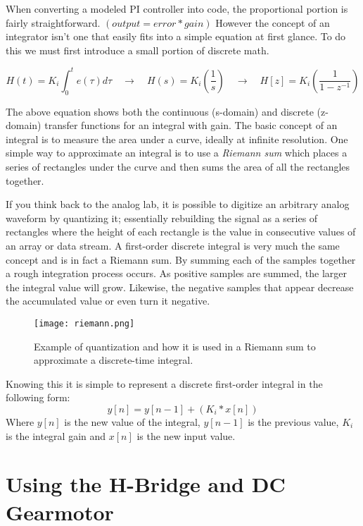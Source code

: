 \documentclass[openany,11pt,fleqn]{book} %
\begin{document}
When converting a modeled PI controller into code, the proportional portion is fairly straightforward. $(output = error * gain)$ However the concept of an integrator isn't one that easily fits into a simple equation at first glance. To do this we must first introduce a small portion of discrete math.

\begin{equation*}
H(t) = K_{i}\int_{0}^{t}e(\tau)d\tau \quad \rightarrow \quad H(s) = K_{i}\left(\frac{1}{s}\right) \quad \rightarrow \quad H[z] = K_{i}\left(\frac{1}{1-z^{-1}}\right)
\end{equation*} 


\noindent The above equation shows both the continuous (s-domain) and discrete (z-domain) transfer functions for an integral with gain. The basic concept of an integral is to measure the area under a curve, ideally at infinite resolution. One simple way to approximate an integral is to use a \textit{Riemann sum} which places a series of rectangles under the curve and then sums the area of all the rectangles together. 

If you think back to the analog lab, it is possible to digitize an arbitrary analog waveform by quantizing it; essentially rebuilding the signal as a series of rectangles where the height of each rectangle is the value in consecutive values of an array or data stream. A first-order discrete integral is very much the same concept and is in fact a Riemann sum. By summing each of the samples together a rough integration process occurs. As positive samples are summed, the larger the integral value will grow. Likewise, the negative samples that appear decrease the accumulated value or even turn it negative. 

\begin{figure}[tb]
    \centering\texttt{[image: riemann.png]}
    \caption{Example of quantization and how it is used in a Riemann sum to approximate a discrete-time integral.}
    \label{riemann}
\end{figure} 

Knowing this it is simple to represent a discrete first-order integral in the following form:
\begin{equation*}
y[n] = y[n-1] + (K_{i} * x[n])
\end{equation*} 
\noindent Where $y[n]$ is the new value of the integral, $y[n-1]$ is the previous value, $K_{i}$ is the integral gain and $x[n]$ is the new input value. 

\section{Using the H-Bridge and DC Gearmotor}
\end{document}
